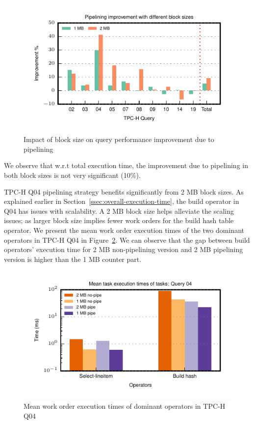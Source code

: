 \begin{figure}
	\centering 
	\includegraphics[width=0.6\textheight]{pipeline/figures/tpch-ccs-block-size-ratio}
	\caption{Impact of block size on query performance improvement due to pipelining}
	\label{fig:tpch-ccs-block-size-ratio}
\end{figure}

We observe that w.r.t total execution time, the improvement due to pipelining in both block sizes is not very significant (10\%).

TPC-H Q04 pipelining strategy benefits significantly from 2 MB block sizes.
As explained earlier in Section~\ref{ssec:overall-execution-time}, the build operator in Q04 has issues with scalability. 
A 2 MB block size helps alleviate the scaling issues; as larger block size implies fewer work orders for the build hash table operator. 
We present the mean work order execution times of the two dominant operators in TPC-H Q04 in Figure~\ref{fig:tpch-q04-ccs-mean-wo-times}.
We can observe that the gap between build operators' execution time for 2 MB non-pipelining version and 2 MB pipelining version is higher than the 1 MB counter part. 

\begin{figure}
	\centering 
	\includegraphics[width=0.6\textheight]{pipeline/figures/tpch-q04-ccs-block-size-mean-wo-times}
	\caption{Mean work order execution times of dominant operators in TPC-H Q04}
	\label{fig:tpch-q04-ccs-mean-wo-times}
\end{figure}

